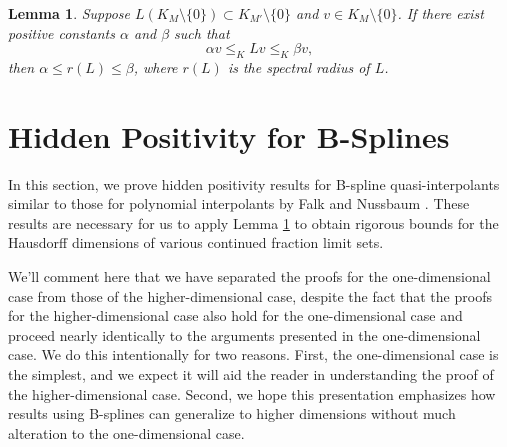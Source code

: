 \documentclass[10pt]{article}
\newtheorem{lemma}[theorem]{Lemma}
\theoremstyle{definition}
\numberwithin{equation}{section}
\numberwithin{figure}{section}
\numberwithin{table}{section}
\begin{document}
\begin{lemma}
Suppose $L(K_M\setminus\{0\})\subset K_{M'}\setminus\{0\}$ and $v\in K_M\setminus\{0\}$. If there exist positive constants $\alpha$ and $\beta$ such that
$$\alpha v\leq_K Lv\leq_K\beta v,$$
then $\alpha\leq r(L)\leq \beta$, where $r(L)$ is the spectral radius of $L$.
\label{lem:cones}
\end{lemma}
 
\section{Hidden Positivity for B-Splines}
In this section, we prove hidden positivity results for B-spline quasi-interpolants similar to those for polynomial interpolants by Falk and Nussbaum \cite{falk2021hidden}. These results are necessary for us to apply Lemma \ref{lem:cones} to obtain rigorous bounds for the Hausdorff dimensions of various continued fraction limit sets.

We'll comment here that we have separated the proofs for the one-dimensional case from those of the higher-dimensional case, despite the fact that the proofs for the higher-dimensional case also hold for the one-dimensional case and proceed nearly identically to the arguments presented in the one-dimensional case. We do this intentionally for two reasons. First, the one-dimensional case is the simplest, and we expect it will aid the reader in understanding the proof of the higher-dimensional case. Second, we hope this presentation emphasizes how results using B-splines can generalize to higher dimensions without much alteration to the one-dimensional case.
\end{document}

